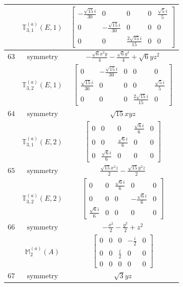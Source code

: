 \documentclass[fleqn,8pt,landscape]{jsarticle}
\begin{document}
\begin{longtable}{ccc}
$  $ & $ \mathbb{T}_{3,1}^{(a)}(E,1) $ & $ \begin{bmatrix} - \frac{\sqrt{15} i}{30} & 0 & 0 & 0 & \frac{\sqrt{5} i}{5} \\ 0 & - \frac{\sqrt{15} i}{30} & 0 & 0 & 0 \\ 0 & 0 & \frac{2 \sqrt{15} i}{15} & 0 & 0 \end{bmatrix} $ \\ \hline
$ 63 $ & $ \text{symmetry} $ & $ - \frac{\sqrt{6} x^{2} y}{4} - \frac{\sqrt{6} y^{3}}{4} + \sqrt{6} y z^{2} $ \\
$  $ & $ \mathbb{T}_{3,2}^{(a)}(E,1) $ & $ \begin{bmatrix} 0 & - \frac{\sqrt{15} i}{30} & 0 & 0 & 0 \\ \frac{\sqrt{15} i}{30} & 0 & 0 & 0 & \frac{\sqrt{5} i}{5} \\ 0 & 0 & 0 & \frac{2 \sqrt{15} i}{15} & 0 \end{bmatrix} $ \\ \hline
$ 64 $ & $ \text{symmetry} $ & $ \sqrt{15} x y z $ \\
$  $ & $ \mathbb{T}_{3,1}^{(a)}(E,2) $ & $ \begin{bmatrix} 0 & 0 & 0 & \frac{\sqrt{6} i}{6} & 0 \\ 0 & 0 & \frac{\sqrt{6} i}{6} & 0 & 0 \\ 0 & \frac{\sqrt{6} i}{6} & 0 & 0 & 0 \end{bmatrix} $ \\ \hline
$ 65 $ & $ \text{symmetry} $ & $ \frac{\sqrt{15} x^{2} z}{2} - \frac{\sqrt{15} y^{2} z}{2} $ \\
$  $ & $ \mathbb{T}_{3,2}^{(a)}(E,2) $ & $ \begin{bmatrix} 0 & 0 & \frac{\sqrt{6} i}{6} & 0 & 0 \\ 0 & 0 & 0 & - \frac{\sqrt{6} i}{6} & 0 \\ \frac{\sqrt{6} i}{6} & 0 & 0 & 0 & 0 \end{bmatrix} $ \\ \hline
$ 66 $ & $ \text{symmetry} $ & $ - \frac{x^{2}}{2} - \frac{y^{2}}{2} + z^{2} $ \\
$  $ & $ \mathbb{M}_{2}^{(a)}(A) $ & $ \begin{bmatrix} 0 & 0 & 0 & - \frac{i}{2} & 0 \\ 0 & 0 & \frac{i}{2} & 0 & 0 \\ 0 & 0 & 0 & 0 & 0 \end{bmatrix} $ \\ \hline
$ 67 $ & $ \text{symmetry} $ & $ \sqrt{3} y z $ \\

\end{longtable}
\end{document}

